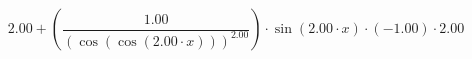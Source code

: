 \documentclass[a4paper]{article}
\begin{document}
\newpage

\[2.00 +  \left( \dfrac{ 1.00 }{  \left( \cos{ \left(\cos{ \left(2.00 \cdot x\right) }\right) } \right)^{2.00 }  }  \right)  \cdot \sin{ \left(2.00 \cdot x\right) } \cdot (-1.00) \cdot 2.00\] 
\end{document}
